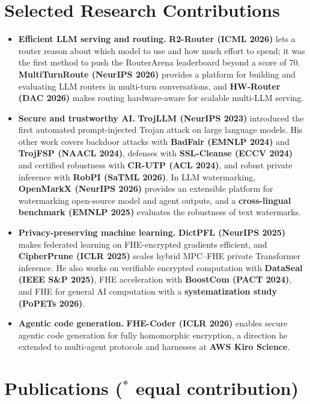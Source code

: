 \documentclass[letterpaper,10pt]{article}
\begin{document}
\section{Selected Research Contributions}
\begin{itemize}[leftmargin=1.1em,itemsep=1pt,topsep=0pt,parsep=0pt]
  \item \textbf{Efficient LLM serving and routing.} \textbf{R2-Router (ICML 2026)} lets
    a router reason about which model to use and how much effort to spend; it was
    the first method to push the RouterArena leaderboard beyond a score of 70.
    \textbf{MultiTurnRoute (NeurIPS 2026)} provides a platform for building and
    evaluating LLM routers in multi-turn conversations, and \textbf{HW-Router (DAC 2026)} makes routing hardware-aware for scalable
    multi-LLM serving.
  \item \textbf{Secure and trustworthy AI.} \textbf{TrojLLM (NeurIPS 2023)} introduced the first
    automated prompt-injected Trojan attack on large language models. His other work
    covers backdoor attacks with \textbf{BadFair (EMNLP 2024)} and \textbf{TrojFSP (NAACL
    2024)}, defenses with \textbf{\mbox{SSL-Cleanse} (ECCV 2024)} and certified robustness
    with \textbf{CR-UTP (ACL 2024)}, and robust private inference with \textbf{RobPI
    (SaTML 2026)}. In LLM watermarking, \textbf{OpenMarkX (NeurIPS 2026)} provides
    an extensible platform for watermarking open-source model and agent outputs, and a \textbf{cross-lingual
    benchmark (EMNLP 2025)} evaluates the robustness of text watermarks.
  \item \textbf{Privacy-preserving machine learning.} \textbf{DictPFL (NeurIPS 2025)}
    makes federated learning on FHE-encrypted gradients efficient, and
    \textbf{CipherPrune (ICLR 2025)} scales hybrid MPC--FHE private Transformer
    inference. He also works on verifiable
    encrypted computation with \textbf{DataSeal (IEEE S\&P 2025)}, FHE acceleration with
    \textbf{\mbox{BoostCom} (PACT 2024)}, and FHE for general AI computation with a
    \textbf{systematization study (PoPETs 2026)}.
  \item \textbf{Agentic code generation.} \textbf{FHE-Coder (ICLR 2026)} enables secure
    agentic code generation for fully homomorphic encryption, a direction he extended
    to multi-agent protocols and harnesses at \textbf{AWS Kiro Science}.
\end{itemize}

\newpage
\section{Publications \texorpdfstring{{\normalfont\small\color{black}($^*$ equal contribution)}}{}}
\end{document}
